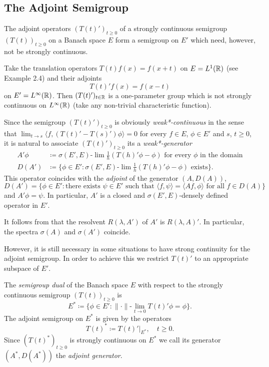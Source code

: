 \subsection{The Adjoint Semigroup}\label{subsec:a1-3.4}
The adjoint operators $(T(t)')_{t \geq 0}$ of a strongly continuous semigroup $(T(t))_{t \geq 0}$ on a Banach space $E$ form a semigroup on $E'$ which need, however, not be strongly continuous.
\begin{example}\label{ex:a1-3.2}
Take the translation operators $T(t)f(x) = f(x+t)$ on $E = L^{1}(\mathbb{R})$ (see Example 2.4) and their adjoints
\[
    T(t)'f(x) = f(x-t)
\]
on $E' = L^{\infty}(\mathbb{R})$.
Then $(T(t)')_{t \in \mathbb{R}}$ is a one-parameter group which is not strongly continuous on $L^{\infty}(\mathbb{R})$ (take any non-trivial characteristic function).
\end{example}

Since the semigroup $(T(t)')_{t \geq 0}$ is obviously \emph{weak*-continuous} in the sense that $\lim_{t \to s} \langle f,(T(t)'-T(s)')\phi \rangle = 0$ for every $f \in E$, $\phi \in E'$ and $s$, $t \geq 0$, it is natural to associate $(T(t)')_{t \geq 0}$ its a \emph{weak*-generator}
\begin{align*}
    A'\phi &\coloneqq \sigma(E',E)\text{-}\lim\frac{1}{h}(T(h)'\phi-\phi) \text{ for every } \phi \text{ in the domain} \\
    D(A') &\coloneqq \{\phi \in E' \colon \sigma(E',E)\text{-}\lim\frac{1}{h}(T(h)'\phi-\phi) \text{ exists}\}.
\end{align*}
This operator coincides with the \emph{adjoint} of the generator $(A,D(A))$, \ie
\[
    D(A') = \{\phi \in E' \colon \text{there exists } \psi \in E' \text{ such that } \langle f,\psi \rangle = \langle Af,\phi \rangle \text{ for all } f \in D(A)\}
\]
and $A'\phi = \psi$.
In particular, $A'$ is a closed and $\sigma(E',E)$-densely defined operator in $E'$.

It follows from \citet[Thm.III.5.30]{kato:1966} that the resolvent $R(\lambda,A')$ of $A'$ is $R(\lambda,A)'$.
In particular, the spectra $\sigma(A)$ and $\sigma(A')$ coincide.

However, it is still necessary in some situations to have strong continuity for the adjoint semigroup.
In order to achieve this we restrict $T(t)'$ to an appropriate subspace of $E'$.
\begin{definition}\label{def:a1-3.1}
The \emph{semigroup dual} of the Banach space $E$ with respect to the strongly continuous semigroup $(T(t))_{t \geq 0}$ is
\[
    E^{*} \coloneqq \{\phi \in E' \colon \|\cdot\|\text{-}\lim_{t \to 0} T(t)'\phi = \phi\}.
\]
The adjoint semigroup on $E^{*}$ is given by the operators
\[
    T(t)^{*} \coloneqq T(t)'|_{E^{*}}, \quad t \geq 0.
\]
Since $(T(t)^{*})_{t \geq 0}$ is strongly continuous on $E^{*}$ we call its generator $(A^{*},D(A^{*}))$ the \emph{adjoint generator}.
\end{definition}

